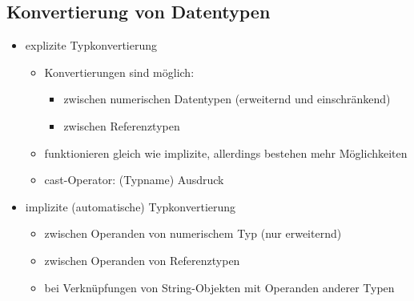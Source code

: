 \documentclass[a4paper,10pt]{article}
\begin{document}
\subsection{Konvertierung von Datentypen}
\begin{itemize}
	\item explizite Typkonvertierung
		\begin{itemize}
			\item Konvertierungen sind möglich:
				\begin{itemize}
					\item zwischen numerischen Datentypen (erweiternd und einschränkend)
					\item zwischen Referenztypen
				\end{itemize}
			\item funktionieren gleich wie implizite, allerdings bestehen mehr Möglichkeiten
			\item cast-Operator: (Typname) Ausdruck
		\end{itemize}
	\item implizite (automatische) Typkonvertierung
		\begin{itemize}
			\item zwischen Operanden von numerischem Typ (nur erweiternd)
			\item zwischen Operanden von Referenztypen
			\item bei Verknüpfungen von String-Objekten mit Operanden anderer Typen
		\end{itemize}
\end{itemize}
\end{document}
